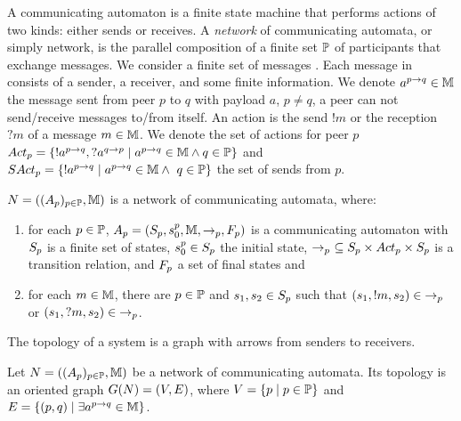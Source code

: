 \documentclass[submission,copyright,creativecommons,UKenglish]{eptcs}
\begin{document}
A communicating automaton is a finite state machine that performs actions of two kinds: either sends or receives. 
A \emph{network} of communicating automata, or simply network, is the parallel composition of a finite set $\mathbb{P}$ of participants that  exchange messages.  We consider a finite set of messages \messageSet. Each message in \messageSet consists of a sender, a receiver, and some finite information.
We denote $a^{p \rightarrow q} \in \mathbb{M}$ the message sent from peer $p$ to  $q$ with payload $a$, $p \neq q$, \ie a peer can not send/receive messages to/from itself.
An action is the send $!m$  or the reception $?m$ of a message $m \in \mathbb{M}$. We denote the set of actions for peer $p$ $Act_{p} = \{ !a^{p \rightarrow q}, ?a^{q \rightarrow p} \mid a^{p \rightarrow q}\in \mathbb{M} \wedge q \in \mathbb{P} \}$  and $SAct_{p}  = \{ !a^{p \rightarrow q} \mid a^{p \rightarrow q}\in \mathbb{M} \wedge ~q \in \mathbb{P} \}$ the set of sends from $p$. 


\begin{definition}
	\label{def:network}
	$N = ( (A_{p})_{p \in \mathbb{P}}, \mathbb{M})$ is a network of communicating automata, where:
	\begin{enumerate}
		\item for each $p \in \mathbb{P}$, $A_{p}=(S_{p}, {s}_{0}^{p}, \mathbb{M},  \rightarrow_{p}, F_{p})$ is a communicating automaton with $S_{p}$ is a finite set of states,  ${s}_{0}^{p} \in S_{p}$ the initial state, $\rightarrow_{p} \ \subseteq S_{p} \times Act_{p} \times S_{p}$ is a transition relation, and $F_{p}$ a set of final states and
		\item for each $ m \in \mathbb{M} $, there are $ p \in \mathbb{P} $ and $ s_1, s_2 \in S_{p} $ such that $ \left(s_1, !m, s_2 \right) \in {\rightarrow_{p}} $ or $ \left(s_1, ?m, s_2 \right) \in {\rightarrow_{p}} $.
	\end{enumerate}
\end{definition}

The topology of a system is a graph with arrows from senders to receivers.

\begin{definition}[Topology]
	\label{def:topology}
	Let $N=((A_{p})_{p\in \mathbb{P}}, \mathbb{M})$ be a network of communicating automata. Its topology is an oriented graph $G(N) = (V,E) $, where $V=\{p \mid p \in  \mathbb{P}\}$ and $E = \left\{ (p, q) \mid \exists a^{p \rightarrow q} \in \mathbb{M} \right\}$.
\end{definition}
\end{document}
